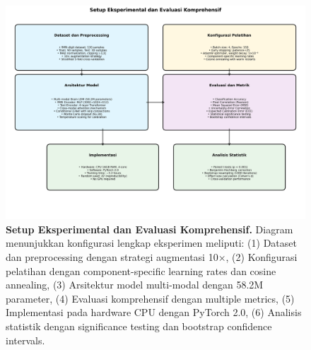 \begin{figure}[htbp]
\centering
\includegraphics[width=\textwidth]{../figures/Fig_experimental_setup.png}
\caption{\textbf{Setup Eksperimental dan Evaluasi Komprehensif.} Diagram menunjukkan konfigurasi lengkap eksperimen meliputi: (1) Dataset dan preprocessing dengan strategi augmentasi 10×, (2) Konfigurasi pelatihan dengan component-specific learning rates dan cosine annealing, (3) Arsitektur model multi-modal dengan 58.2M parameter, (4) Evaluasi komprehensif dengan multiple metrics, (5) Implementasi pada hardware CPU dengan PyTorch 2.0, (6) Analisis statistik dengan significance testing dan bootstrap confidence intervals.}
\label{fig:experimental_setup}
\end{figure}
